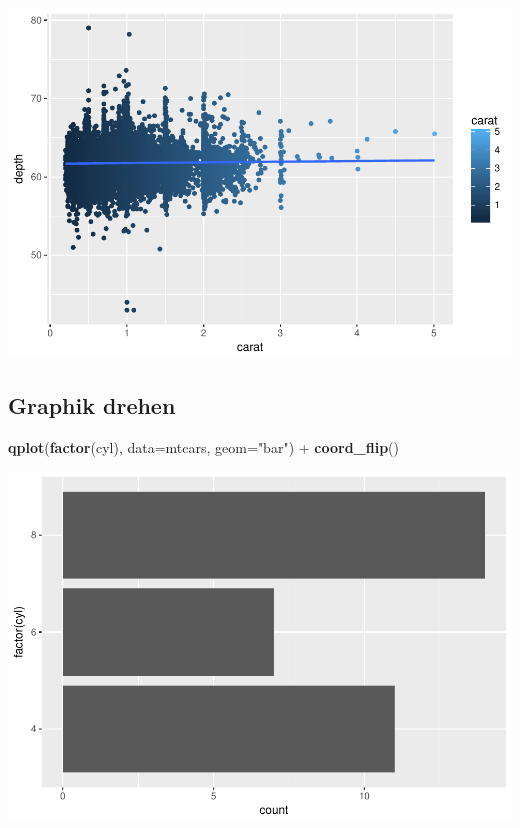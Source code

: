 \documentclass[]{article}
\newenvironment{Shaded}{\begin{snugshade}}{\end{snugshade}}
\newcommand{\KeywordTok}[1]{\textcolor[rgb]{0.13,0.29,0.53}{\textbf{{#1}}}}
\newcommand{\DataTypeTok}[1]{\textcolor[rgb]{0.13,0.29,0.53}{{#1}}}
\newcommand{\StringTok}[1]{\textcolor[rgb]{0.31,0.60,0.02}{{#1}}}
\newcommand{\NormalTok}[1]{{#1}}
\begin{document}
\includegraphics{Intro_Datenanalyse1_files/figure-latex/unnamed-chunk-226-1.pdf}

\subsection{Graphik drehen}\label{graphik-drehen}

\begin{Shaded}
\begin{Highlighting}[]
\KeywordTok{qplot}\NormalTok{(}\KeywordTok{factor}\NormalTok{(cyl), }\DataTypeTok{data=}\NormalTok{mtcars, }\DataTypeTok{geom=}\StringTok{"bar"}\NormalTok{) +}\StringTok{ }
\KeywordTok{coord_flip}\NormalTok{()}
\end{Highlighting}
\end{Shaded}

\includegraphics{Intro_Datenanalyse1_files/figure-latex/unnamed-chunk-227-1.pdf}
\end{document}
